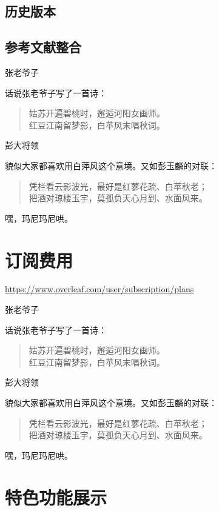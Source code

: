\documentclass[]{ctexbook}
\begin{document}
\hypertarget{section-9}{%
\section{历史版本}\label{section-9}}

\hypertarget{section-10}{%
\section{参考文献整合}\label{section-10}}

张老爷子

话说张老爷子写了一首诗：

\begin{quote}
姑苏开遍碧桃时，邂逅河阳女画师。\\
红豆江南留梦影，白苹风末唱秋词。
\end{quote}

彭大将领

貌似大家都喜欢用白萍风这个意境。又如彭玉麟的对联：

\begin{quote}
凭栏看云影波光，最好是红蓼花疏、白苹秋老；\\
把酒对琼楼玉宇，莫孤负天心月到、水面风来。
\end{quote}

嘿，玛尼玛尼哄。

\hypertarget{section-11}{%
\chapter{订阅费用}\label{section-11}}

\url{https://www.overleaf.com/user/subscription/plans}

张老爷子

话说张老爷子写了一首诗：

\begin{quote}
姑苏开遍碧桃时，邂逅河阳女画师。\\
红豆江南留梦影，白苹风末唱秋词。
\end{quote}

彭大将领

貌似大家都喜欢用白萍风这个意境。又如彭玉麟的对联：

\begin{quote}
凭栏看云影波光，最好是红蓼花疏、白苹秋老；\\
把酒对琼楼玉宇，莫孤负天心月到、水面风来。
\end{quote}

嘿，玛尼玛尼哄。

\hypertarget{section-12}{%
\chapter{特色功能展示}\label{section-12}}
\end{document}
